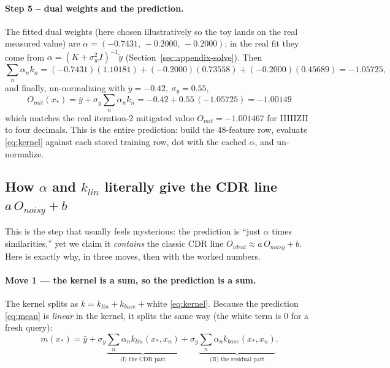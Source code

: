 \documentclass[11pt]{article}
\def\bm#1{#1}%
\def\texttt#1{#1}%
\def\mathrm#1{#1}%
\begin{document}
\paragraph{Step 5 -- dual weights and the prediction.} The fitted dual weights
(here chosen illustratively so the toy lands on the real measured value) are
$\bm\alpha=(-0.7431,\,-0.2000,\,-0.2000)$; in the real fit they come from
$\bm\alpha=(K+\sigma_w^2I)^{-1}\tilde{\bm y}$ (Section~\ref{sec:appendix-solve}).
Then
\[
\sum_{n}\alpha_n k_n
=(-0.7431)(1.10181)+(-0.2000)(0.73558)+(-0.2000)(0.45689)
=-1.05725,
\]
and finally, un-normalizing with $\bar y=-0.42,\ \sigma_y=0.55$,
\[
\boxed{\,O_{\mathrm{mit}}(\bm x_*)=\bar y+\sigma_y\sum_n\alpha_n k_n
=-0.42+0.55\,(-1.05725)=-1.00149\,}
\]
which matches the real iteration-2 mitigated value $O_{\mathrm{mit}}=-1.001467$
for \texttt{IIIIIZII} to four decimals. This is the entire prediction: build the
$48$-feature row, evaluate \eqref{eq:kernel} against each stored training row,
dot with the cached $\bm\alpha$, and un-normalize.

\subsection{How \texorpdfstring{$\bm\alpha$}{alpha} and \texorpdfstring{$k_{\mathrm{lin}}$}{k\_lin} literally give the CDR line \texorpdfstring{$a\,O_{\mathrm{noisy}}+b$}{a O\_noisy + b}}
\label{sec:cdr-emerges}

This is the step that usually feels mysterious: the prediction is ``just
$\bm\alpha$ times similarities,'' yet we claim it \emph{contains} the classic CDR
line $O_{\mathrm{ideal}}\approx a\,O_{\mathrm{noisy}}+b$. Here is exactly why, in
three moves, then with the worked numbers.

\paragraph{Move 1 --- the kernel is a sum, so the prediction is a sum.}
The kernel splits as $k=k_{\mathrm{lin}}+k_{\mathrm{base}}+\text{white}$
\eqref{eq:kernel}. Because the prediction \eqref{eq:mean} is \emph{linear} in the
kernel, it splits the same way (the white term is $0$ for a fresh query):
\begin{equation}
m(\bm x_*)=\bar y
+\sigma_y\underbrace{\sum_n\alpha_n k_{\mathrm{lin}}(\bm x_*,\bm x_n)}_{\text{(I) the CDR part}}
+\sigma_y\underbrace{\sum_n\alpha_n k_{\mathrm{base}}(\bm x_*,\bm x_n)}_{\text{(II) the residual part}} .
\label{eq:mean-split}
\end{equation}
\end{document}
